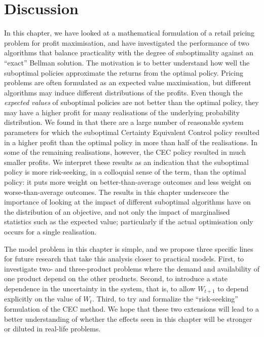 \documentclass[main.tex]{subfiles}
\begin{document}
\section{Discussion}\label{sec:adp_conclusion}
In this chapter, we have looked at a mathematical formulation of a
retail pricing problem for profit maximisation, and have investigated
the performance of two algorithms that balance practicality
with the degree of suboptimality against an ``exact'' Bellman
solution. The motivation is to better understand
how well the suboptimal policies approximate the returns from the
optimal policy.
Pricing problems are often formulated as an expected value
maximisation, but different algorithms may induce different
distributions of the profits.
Even though the \emph{expected values} of suboptimal policies are not better
than the optimal policy, they may have a higher profit for many
realisations of the underlying probability distribution.
We found in  that there are a
large number of
reasonable system parameters for which
the suboptimal Certainty Equivalent Control policy resulted in a higher profit
than the optimal policy in more than half of the realisations.
In some of the remaining realisations, however, the CEC policy resulted in
much smaller profits. We interpret these results as an indication that
the suboptimal policy is more risk-seeking, in a colloquial sense of
the term,  than the optimal policy: it puts more weight on
better-than-average outcomes and less weight on worse-than-average outcomes.
The results in this chapter underscore the importance of looking at
the impact of
different suboptimal algorithms have on the distribution of
an objective, and not only the impact of
marginalised statistics such as the expected value;
particularly if the actual optimisation only occurs for a single realisation.


The model problem in this chapter is simple, and
we propose three specific lines for future research that
take this analysis closer to practical models.
First, to investigate two- and three-product problems where the demand and
availability of one product depend on the other products.
Second, to introduce a state dependence in the uncertainty in the
system, that is, to allow $W_{t+1}$ to depend explicitly on the value
of $W_t$. Third, to try and formalize the ``risk-seeking'' formulation
of the CEC method.
We hope that these two extensions will lead to a better understanding of
whether the effects seen in this chapter will be stronger or diluted
in real-life problems.


\biblio{} %
\end{document}
